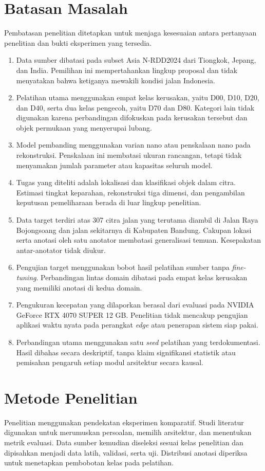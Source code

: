 \section{Batasan Masalah}
Pembatasan penelitian ditetapkan untuk menjaga kesesuaian antara pertanyaan penelitian dan bukti eksperimen yang tersedia.
\begin{enumerate}
\item Data sumber dibatasi pada subset Asia N-RDD2024 dari Tiongkok, Jepang, dan India. Pemilihan ini mempertahankan lingkup proposal dan tidak menyatakan bahwa ketiganya mewakili kondisi jalan Indonesia.
\item Pelatihan utama menggunakan empat kelas kerusakan, yaitu D00, D10, D20, dan D40, serta dua kelas pengecoh, yaitu D70 dan D80. Kategori lain tidak digunakan karena perbandingan difokuskan pada kerusakan tersebut dan objek permukaan yang menyerupai lubang.
\item Model pembanding menggunakan varian nano atau penskalaan nano pada rekonstruksi. Penskalaan ini membatasi ukuran rancangan, tetapi tidak menyamakan jumlah parameter atau kapasitas seluruh model.
\item Tugas yang diteliti adalah lokalisasi dan klasifikasi objek dalam citra. Estimasi tingkat keparahan, rekonstruksi tiga dimensi, dan pengambilan keputusan pemeliharaan berada di luar lingkup penelitian.
\item Data target terdiri atas 307 citra jalan yang terutama diambil di Jalan Raya Bojongsoang dan jalan sekitarnya di Kabupaten Bandung. Cakupan lokasi serta anotasi oleh satu anotator membatasi generalisasi temuan. Kesepakatan antar-anotator tidak diukur.
\item Pengujian target menggunakan bobot hasil pelatihan sumber tanpa \textit{fine-tuning}. Perbandingan lintas domain dibatasi pada empat kelas kerusakan yang memiliki anotasi di kedua domain.
\item Pengukuran kecepatan yang dilaporkan berasal dari evaluasi pada NVIDIA GeForce RTX 4070 SUPER 12 GB. Penelitian tidak mencakup pengujian aplikasi waktu nyata pada perangkat \textit{edge} atau penerapan sistem siap pakai.
\item Perbandingan utama menggunakan satu \textit{seed} pelatihan yang terdokumentasi. Hasil dibahas secara deskriptif, tanpa klaim signifikansi statistik atau pemisahan pengaruh setiap modul arsitektur secara kausal.
\end{enumerate}

\section{Metode Penelitian}
Penelitian menggunakan pendekatan eksperimen komparatif. Studi literatur digunakan untuk merumuskan persoalan, memilih arsitektur, dan menentukan metrik evaluasi. Data sumber kemudian diseleksi sesuai kelas penelitian dan dipisahkan menjadi data latih, validasi, serta uji. Distribusi anotasi diperiksa untuk menetapkan pembobotan kelas pada pelatihan.

